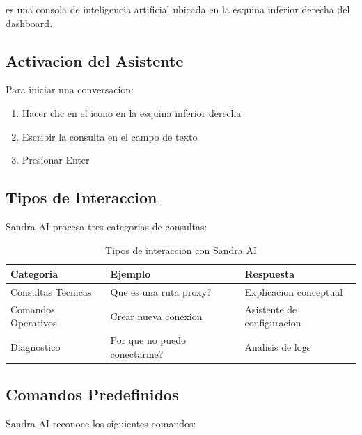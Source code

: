\sandraai{} es una consola de inteligencia artificial ubicada en la esquina inferior derecha del dashboard.

\subsection{Activacion del Asistente}

Para iniciar una conversacion:
\begin{enumerate}[leftmargin=*]
    \item Hacer clic en el icono {\color{sandraGreen}} en la esquina inferior derecha
    \item Escribir la consulta en el campo de texto
    \item Presionar Enter
\end{enumerate}

\subsection{Tipos de Interaccion}

Sandra AI procesa tres categorias de consultas:

\begin{table}[H]
\centering
\begin{tabular}{p{4cm}p{4cm}p{6cm}}
\toprule
\textbf{Categoria} & \textbf{Ejemplo} & \textbf{Respuesta} \\
\midrule
Consultas Tecnicas & Que es una ruta proxy? & Explicacion conceptual \\
\midrule
Comandos Operativos & Crear nueva conexion & Asistente de configuracion \\
\midrule
Diagnostico & Por que no puedo conectarme? & Analisis de logs \\
\bottomrule
\end{tabular}
\caption{Tipos de interaccion con Sandra AI}
\label{tab:tipos-ai}
\end{table}

\subsection{Comandos Predefinidos}

Sandra AI reconoce los siguientes comandos:

